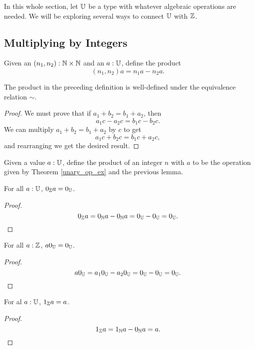 \documentclass[../../math.tex]{subfiles}
\begin{document}
In this whole section, let $\mathbb{U}$ be a type with whatever algebraic operations are
needed.  We will be exploring several ways to connect $\mathbb{U}$ with $\mathbb{Z}$.

\subsection{Multiplying by Integers}

\begin{definition}
    Given an $(n_1, n_2) : \mathbb{N} \times \mathbb{N}$ and an $a : \mathbb{U}$, define the product
    \[
        (n_1, n_2)a = n_1a - n_2a.
    \]
\end{definition}

\begin{lemma}
    The product in the preceding definition is well-defined under the
    equivalence relation $\sim$.
\end{lemma}
\begin{proof}
    We must prove that if $a_1 + b_2 = b_1 + a_2$, then
    \[
        a_1c - a_2c = b_1c - b_2c.
    \]
    We can multiply $a_1 + b_2 = b_1 + a_2$ by $c$ to get
    \[
        a_1c + b_2c = b_1c + a_2c,
    \]
    and rearranging we get the desired result.
\end{proof}

\begin{definition}
    Given a value $a : \mathbb{U}$, define the product of an integer $n$ with $a$ to be
    the operation given by Theorem \ref{unary_op_ex} and the previous lemma.
\end{definition}

\begin{theorem}
    For all $a : \mathbb{U}$, $0_{\mathbb{Z}} a = 0_{\mathbb{U}}$.
\end{theorem}
\begin{proof}
    \[
        0_{\mathbb{Z}} a = 0_{\mathbb{N}} a - 0_{\mathbb{N}} a = 0_{\mathbb{U}} - 0_{\mathbb{U}} = 0_{\mathbb{U}}.
    \]
\end{proof}

\begin{theorem}
    For all $a : \mathbb{Z}$, $a0_{\mathbb{U}} = 0_{\mathbb{U}}$.
\end{theorem}
\begin{proof}
    \[
        a0_{\mathbb{U}} = a_10_{\mathbb{U}} - a_20_{\mathbb{U}} = 0_{\mathbb{U}} - 0_{\mathbb{U}} = 0_{\mathbb{U}}.
    \]
\end{proof}

\begin{theorem}
    For al $a : \mathbb{U}$, $1_{\mathbb{Z}} a = a$.
\end{theorem}
\begin{proof}
    \[
        1_{\mathbb{Z}} a = 1_{\mathbb{N}} a - 0_{\mathbb{N}} a = a.
    \]
\end{proof}
\end{document}
